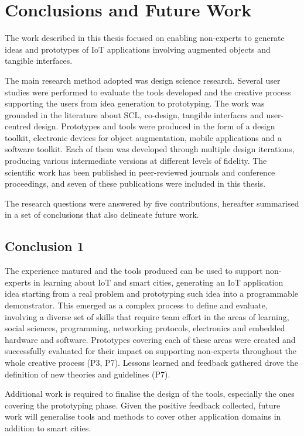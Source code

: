 \chapter{Conclusions and Future Work}
\label{cha:conclusions}


The work described in this thesis focused on enabling non-experts to generate ideas and prototypes of IoT applications involving augmented objects and tangible interfaces.

The main research method adopted was design science research. Several user studies were performed to evaluate the tools developed and the creative process supporting the users from idea generation to prototyping.
The work was grounded in the literature about SCL, co-design, tangible interfaces and user-centred design.
Prototypes and tools were produced in the form of a design toolkit, electronic devices for object augmentation, mobile applications and a software toolkit. Each of them was developed through multiple design iterations, producing various intermediate versions at different levels of fidelity.
The scientific work has been published in peer-reviewed journals and conference proceedings, and seven of these publications were included in this thesis.

The research questions were answered by five contributions, hereafter summarised in a set of conclusions that also delineate future work. 


\section*{Conclusion 1}

The experience matured and the tools produced can be used to support non-experts in learning about IoT and smart cities, generating an IoT application idea starting from a real problem and prototyping such idea into a programmable demonstrator.
This emerged as a complex process to define and evaluate, involving a diverse set of skills that require team effort in the areas of learning, social sciences, programming, networking protocols, electronics and embedded hardware and software.
Prototypes covering each of these areas were created and successfully evaluated for their impact on supporting non-experts throughout the whole creative process (P3, P7).
Lessons learned and feedback gathered drove the definition of new theories and guidelines (P7).

Additional work is required to finalise the design of the tools, especially the ones covering the prototyping phase. Given the positive feedback collected, future work will generalise tools and methods to cover other application domains in addition to smart cities.


